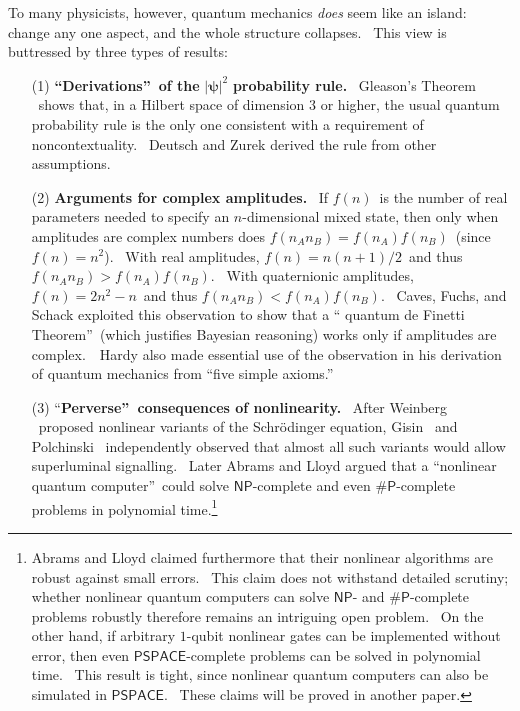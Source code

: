 \documentclass[12pt]{article}%
\begin{document}
To many physicists, however, quantum mechanics \textit{does} seem like an
island: change any one aspect, and the whole structure collapses. \ This view
is buttressed by three types of results:

\begin{enumerate}
\item[(1)] \textbf{\textquotedblleft Derivations\textquotedblright\ of the
}$\left\vert \mathbf{\psi}\right\vert ^{2}$\textbf{ probability rule.}
\ Gleason's Theorem \cite{gleason}\ shows that, in a Hilbert space of dimension
$3$ or higher, the usual quantum probability rule is the only one consistent
with a requirement of noncontextuality. \ Deutsch \cite{deutsch} and
Zurek \cite{zurek} derived the rule from other assumptions.

\item[(2)] \textbf{Arguments for complex amplitudes.} \ If $f(  n)
$\ is the number of real parameters needed to specify an $n$-dimensional mixed
state, then only when amplitudes are complex numbers does $f(  n_{A}%
n_{B})  =f(  n_{A})  f(  n_{B})  $\ (since
$f(  n)  =n^{2}$). \ With real amplitudes, $f(  n)
=n(  n+1)  /2$\ and thus $f(  n_{A}n_{B})  >f(
n_{A})  f(  n_{B})  $. \ With quaternionic amplitudes,
$f(  n)  =2n^{2}-n$\ and thus $f(  n_{A}n_{B})
<f(  n_{A})  f(  n_{B})  $. \ Caves, Fuchs, and
Schack \cite{cfs} exploited this observation to show that a \textquotedblleft
quantum de Finetti Theorem\textquotedblright\ (which justifies Bayesian
reasoning) works only if amplitudes are complex.\ \ Hardy \cite{hardy} also
made essential use of the observation in his derivation of quantum mechanics
from \textquotedblleft five simple axioms.\textquotedblright

\item[(3)] \textquotedblleft\textbf{Perverse\textquotedblright\ consequences
of nonlinearity.} \ After Weinberg \cite{weinberg}\ proposed nonlinear variants
of the Schr\"{o}dinger equation, Gisin \cite{gisin}\ and
Polchinski \cite{polchinski}\ independently observed that almost all such
variants would allow superluminal signalling. \ Later Abrams and
Lloyd \cite{al} argued that a \textquotedblleft nonlinear quantum
computer\textquotedblright\ could solve $\mathsf{NP}$-complete and even
$\mathsf{\#P}$-complete problems in polynomial time.\footnote{Abrams and Lloyd
claimed furthermore that their nonlinear algorithms are robust against small
errors. \ This claim does not withstand detailed scrutiny; whether nonlinear
quantum computers can solve $\mathsf{NP}$- and $\mathsf{\#P}$-complete
problems robustly therefore remains an intriguing open problem. \ On the other
hand, if arbitrary $1$-qubit nonlinear gates can be implemented without error,
then even $\mathsf{PSPACE}$-complete problems can be solved in polynomial
time. \ This result is tight, since nonlinear quantum computers can also be
simulated in $\mathsf{PSPACE}$. \ These claims will be proved in another paper.}
\end{enumerate}
\end{document}
